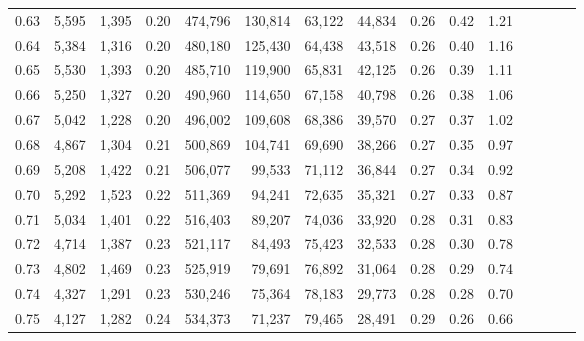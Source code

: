 \begin{tabular}{rrrcrrrrrrrrrrr}
0.63 &   5,595 &  1,395 &                                       0.20 &  474,796 &  130,814 &   63,122 &   44,834 &  0.26 &  0.42 &                         1.21 \\
0.64 &   5,384 &  1,316 &                                       0.20 &  480,180 &  125,430 &   64,438 &   43,518 &  0.26 &  0.40 &                         1.16 \\
0.65 &   5,530 &  1,393 &                                       0.20 &  485,710 &  119,900 &   65,831 &   42,125 &  0.26 &  0.39 &                         1.11 \\
0.66 &   5,250 &  1,327 &                                       0.20 &  490,960 &  114,650 &   67,158 &   40,798 &  0.26 &  0.38 &                         1.06 \\
0.67 &   5,042 &  1,228 &                                       0.20 &  496,002 &  109,608 &   68,386 &   39,570 &  0.27 &  0.37 &                         1.02 \\
0.68 &   4,867 &  1,304 &                                       0.21 &  500,869 &  104,741 &   69,690 &   38,266 &  0.27 &  0.35 &                         0.97 \\
0.69 &   5,208 &  1,422 &                                       0.21 &  506,077 &   99,533 &   71,112 &   36,844 &  0.27 &  0.34 &                         0.92 \\
0.70 &   5,292 &  1,523 &                                       0.22 &  511,369 &   94,241 &   72,635 &   35,321 &  0.27 &  0.33 &                         0.87 \\
0.71 &   5,034 &  1,401 &                                       0.22 &  516,403 &   89,207 &   74,036 &   33,920 &  0.28 &  0.31 &                         0.83 \\
0.72 &   4,714 &  1,387 &                                       0.23 &  521,117 &   84,493 &   75,423 &   32,533 &  0.28 &  0.30 &                         0.78 \\
0.73 &   4,802 &  1,469 &                                       0.23 &  525,919 &   79,691 &   76,892 &   31,064 &  0.28 &  0.29 &                         0.74 \\
0.74 &   4,327 &  1,291 &                                       0.23 &  530,246 &   75,364 &   78,183 &   29,773 &  0.28 &  0.28 &                         0.70 \\
0.75 &   4,127 &  1,282 &                                       0.24 &  534,373 &   71,237 &   79,465 &   28,491 &  0.29 &  0.26 &                         0.66 \\

\end{tabular}
